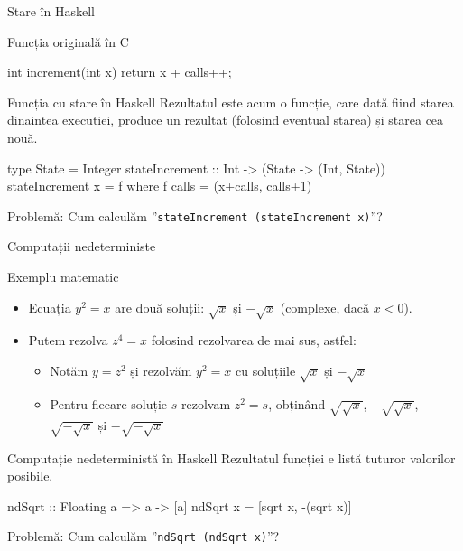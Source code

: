 \documentclass[xcolor=pdftex,romanian,colorlinks]{beamer}
\begin{document}
\begin{frame}[fragile]{Stare în Haskell}
\begin{block}{Funcția originală în C}
\vspace{-2ex}
\begin{asciic}
int increment(int x) {
  return x + calls++;
}
\end{asciic}
\end{block}
\begin{block}{Funcția cu stare în Haskell}
Rezultatul este acum o funcție, care dată fiind starea dinaintea executiei, produce un rezultat (folosind eventual starea) și starea cea nouă.
\begin{asciihs}
type State = Integer
stateIncrement :: Int -> (State -> (Int, State))
stateIncrement x = f
  where f calls = (x+calls, calls+1)
\end{asciihs}

\alert{Problemă:} Cum calculăm ”\lstinline$stateIncrement (stateIncrement x)$”?
\end{block}
\end{frame}

\begin{frame}[fragile]{Computații nedeterministe}
\begin{block}{Exemplu matematic}
\begin{itemize}
\item Ecuația $y^2 = x$ are două soluții: $\sqrt{x}$ și $-\sqrt{x}$ (complexe, dacă $x<0$).
\item Putem rezolva $z^4 = x$ folosind rezolvarea de mai sus, astfel:
\begin{itemize}
\item Notăm $y = z^2$ și rezolvăm $y^2 = x$ cu soluțiile $\sqrt{x}$ și $-\sqrt{x}$
\item Pentru fiecare soluție $s$ rezolvam $z^2 = s$, obținând $\sqrt{\sqrt{x}}$, $-\sqrt{\sqrt{x}}$, $\sqrt{-\sqrt{x}}$ și $-\sqrt{-\sqrt{x}}$
\end{itemize}
\end{itemize}
\end{block}

\begin{block}{Computație nedeterministă în Haskell}
Rezultatul funcției e listă tuturor valorilor posibile.
\begin{asciihs}
ndSqrt :: Floating a => a -> [a]
ndSqrt x = [sqrt x, -(sqrt x)]
\end{asciihs}
\alert{Problemă:} Cum calculăm ”\lstinline$ndSqrt (ndSqrt x)$”?

\end{block}
\end{frame}
\end{document}

